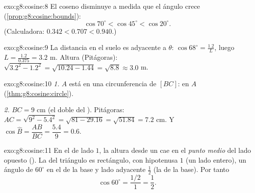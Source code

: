 \begin{solution}{exo:g8:cosine:8}
El coseno disminuye a medida que el ángulo crece
(\cref{prop:g8:cosine:bounds}):
\[
\cos 70^\circ < \cos 45^\circ < \cos 20^\circ .
\]
(Calculadora: $0.342 < 0.707 < 0.940$.)
\end{solution}

\begin{solution}{exo:g8:cosine:9}
La distancia en el suelo es adyacente a $\theta$:
$\cos 68^\circ = \frac{1.2}{L}$, luego
$L = \frac{1.2}{0.375} = 3.2$ m. Altura (Pitágoras):
$\sqrt{3.2^2 - 1.2^2} = \sqrt{10.24 - 1.44} = \sqrt{8.8} \approx 3.0$
m.
\end{solution}

\begin{solution}{exo:g8:cosine:10}
\emph{1.} $A$ está en una circunferencia de  $[BC]$:  en $A$
(\cref{thm:g8:cosine:circle}).

\emph{2.} $BC = 9$ cm (el doble del ). Pitágoras:
$AC = \sqrt{9^2 - 5.4^2} = \sqrt{81 - 29.16} = \sqrt{51.84} = 7.2$
cm. Y $\cos\widehat B = \dfrac{AB}{BC} = \dfrac{5.4}{9} = 0.6$.
\end{solution}

\begin{solution}{exo:g8:cosine:11}
En el  de lado $1$, la altura desde un 
cae en el \emph{punto medio} del lado opuesto (). La  del triángulo es rectángulo, con hipotenusa $1$
(un lado entero), un ángulo de $60^\circ$ en el  de la base y
lado adyacente $\frac12$ (la  de la base). Por tanto
\[
\cos 60^\circ = \frac{1/2}{1} = \frac12 .
\]
\end{solution}


